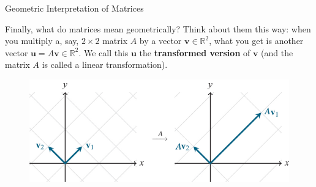 \documentclass{beamer}
\newcommand{\vv}{\mathbf{v}}
\newcommand{\vu}{\mathbf{u}}
\newcommand{\R}{\mathbb{R}}
\begin{document}
\begin{frame}{Geometric Interpretation of Matrices}

Finally, what do matrices mean geometrically? \pause Think about them this way: when you multiply a, say, $2\times 2$ matrix $A$ by a vector $\vv\in\R^2$, what you get is another vector $\vu=A\vv\in\R^2$. We call this $\vu$ the \textbf{transformed version} of $\vv$ (and the matrix $A$ is called a linear transformation).
\pause

\begin{figure}
    \centering
    \includegraphics[width=0.75\linewidth]{viz ex.png}
    
    
\end{figure}

\end{frame}
\end{document}
